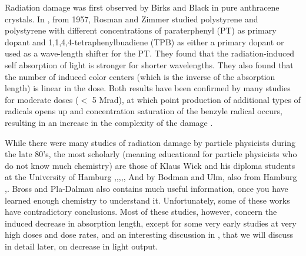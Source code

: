 Radiation damage was first observed by Birks and Black \cite{birksblack}
in pure anthracene crystals.
In \cite{rosmanzimmer}, from 1957, Rosman and Zimmer studied
 polystyrene and polystyrene with
different concentrations of paraterphenyl (PT) as primary dopant
and 1,1,4,4-tetraphenylbuadiene (TPB) as either a primary dopant or used
as a wave-length shifter for the PT.
They found that the radiation-induced self absorption
of light is stronger for shorter wavelengths.  They also found
that the number of induced color centers (which is the inverse 
of the absorption length) is linear in the dose.
Both results have been
confirmed by many studies for moderate doses ($<$ 5 Mrad),
at which point production of additional types of radicals opens up
and concentration saturation of the benzyle radical occurs,
resulting in an increase in the complexity of the damage \cite{harrah}.


While there were many studies of radiation damage by particle physicists
during the late 80's,
the most scholarly (meaning educational for
particle physicists who do not know much chemistry)
 are those of Klaus Wick and his diploma
students at the University of Hamburg 
\cite{34504},\cite{Wick1991472},\cite{289295},\cite{173180},\cite{467829},\cite{Wulkop1995141}
And by Bodman and Ulm, also from Hamburg \cite{Bodmann2001299},\cite{Bodmann2003495}.  Bross and Pla-Dalmau \cite{173178} also contains much useful
information, once you have learned enough chemistry to understand it.
Unfortunately, some of these works have
contradictory conclusions.
Most of these studies, however, concern the induced decrease
in absorption length, except for some very early studies
at very high doses and dose rates, and
an interesting discussion in
\cite{Wick1991472}, that we will discuss in detail later, on
decrease in light output.


